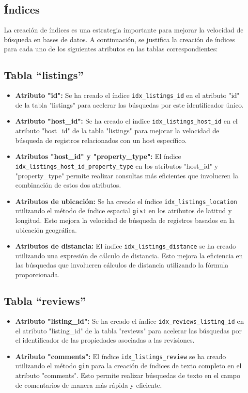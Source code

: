 \subsection{Índices}

La creación de índices es una estrategia importante para mejorar la velocidad de búsqueda en bases de datos. A continuación, se justifica la creación de índices para cada uno de los siguientes atributos en las tablas correspondientes:

\subsection*{Tabla ``listings''}

\begin{itemize}
  \item \textbf{Atributo "id":} Se ha creado el índice \texttt{idx\_listings\_id} en el atributo "id" de la tabla "listings" para acelerar las búsquedas por este identificador único.
  \item \textbf{Atributo "host\_id":} Se ha creado el índice \texttt{idx\_listings\_host\_id} en el atributo "host\_id" de la tabla "listings" para mejorar la velocidad de búsqueda de registros relacionados con un host específico.
  \item \textbf{Atributos "host\_id" y "property\_type":} El índice \\ \texttt{idx\_listings\_host\_id\_property\_type} en los atributos "host\_id" y "property\_type" permite realizar consultas más eficientes que involucren la combinación de estos dos atributos.
  \item \textbf{Atributos de ubicación:} Se ha creado el índice \texttt{idx\_listings\_location} utilizando el método de índice espacial \texttt{gist} en los atributos de latitud y longitud. Esto mejora la velocidad de búsqueda de registros basados en la ubicación geográfica.
  \item \textbf{Atributos de distancia:} El índice \texttt{idx\_listings\_distance} se ha creado utilizando una expresión de cálculo de distancia. Esto mejora la eficiencia en las búsquedas que involucren cálculos de distancia utilizando la fórmula proporcionada.
\end{itemize}

\subsection*{Tabla ``reviews''}

\begin{itemize}
  \item \textbf{Atributo "listing\_id":} Se ha creado el índice \texttt{idx\_reviews\_listing\_id} en el atributo "listing\_id" de la tabla "reviews" para acelerar las búsquedas por el identificador de las propiedades asociadas a las revisiones.
  \item \textbf{Atributo "comments":} El índice \texttt{idx\_listings\_review} se ha creado utilizando el método \texttt{gin} para la creación de índices de texto completo en el atributo "comments". Esto permite realizar búsquedas de texto en el campo de comentarios de manera más rápida y eficiente.
\end{itemize}

